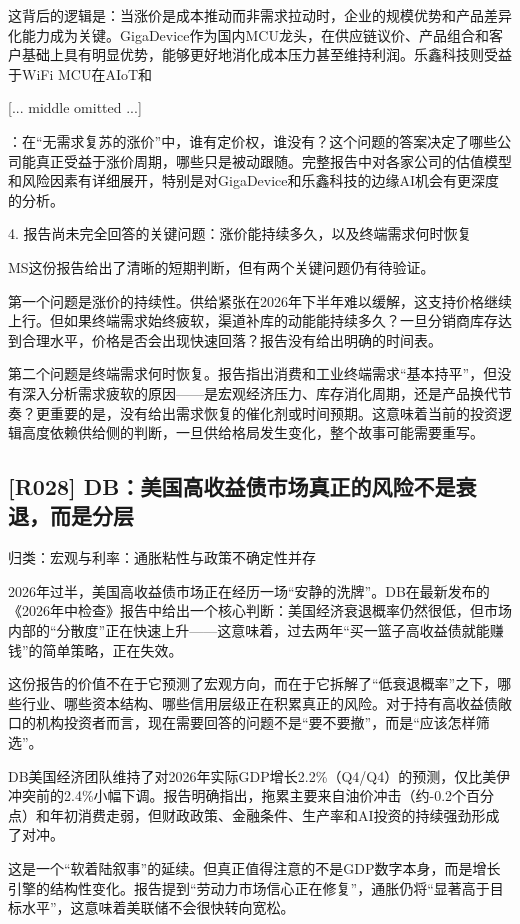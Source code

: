 \documentclass[11pt]{ctexart}
\begin{document}
这背后的逻辑是：当涨价是成本推动而非需求拉动时，企业的规模优势和产品差异化能力成为关键。GigaDevice作为国内MCU龙头，在供应链议价、产品组合和客户基础上具有明显优势，能够更好地消化成本压力甚至维持利润。乐鑫科技则受益于WiFi MCU在AIoT和

[... middle omitted ...]

：在“无需求复苏的涨价”中，谁有定价权，谁没有？这个问题的答案决定了哪些公司能真正受益于涨价周期，哪些只是被动跟随。完整报告中对各家公司的估值模型和风险因素有详细展开，特别是对GigaDevice和乐鑫科技的边缘AI机会有更深度的分析。

4. 报告尚未完全回答的关键问题：涨价能持续多久，以及终端需求何时恢复

MS这份报告给出了清晰的短期判断，但有两个关键问题仍有待验证。

第一个问题是涨价的持续性。供给紧张在2026年下半年难以缓解，这支持价格继续上行。但如果终端需求始终疲软，渠道补库的动能能持续多久？一旦分销商库存达到合理水平，价格是否会出现快速回落？报告没有给出明确的时间表。

第二个问题是终端需求何时恢复。报告指出消费和工业终端需求“基本持平”，但没有深入分析需求疲软的原因——是宏观经济压力、库存消化周期，还是产品换代节奏？更重要的是，没有给出需求恢复的催化剂或时间预期。这意味着当前的投资逻辑高度依赖供给侧的判断，一旦供给格局发生变化，整个故事可能需要重写。

\subsection{[R028] DB：美国高收益债市场真正的风险不是衰退，而是分层}
{\small\color{refgray}归类：宏观与利率：通胀粘性与政策不确定性并存}

2026年过半，美国高收益债市场正在经历一场“安静的洗牌”。DB在最新发布的《2026年中检查》报告中给出一个核心判断：美国经济衰退概率仍然很低，但市场内部的“分散度”正在快速上升——这意味着，过去两年“买一篮子高收益债就能赚钱”的简单策略，正在失效。

这份报告的价值不在于它预测了宏观方向，而在于它拆解了“低衰退概率”之下，哪些行业、哪些资本结构、哪些信用层级正在积累真正的风险。对于持有高收益债敞口的机构投资者而言，现在需要回答的问题不是“要不要撤”，而是“应该怎样筛选”。

DB美国经济团队维持了对2026年实际GDP增长2.2\%（Q4/Q4）的预测，仅比美伊冲突前的2.4\%小幅下调。报告明确指出，拖累主要来自油价冲击（约-0.2个百分点）和年初消费走弱，但财政政策、金融条件、生产率和AI投资的持续强劲形成了对冲。

这是一个“软着陆叙事”的延续。但真正值得注意的不是GDP数字本身，而是增长引擎的结构性变化。报告提到“劳动力市场信心正在修复”，通胀仍将“显著高于目标水平”，这意味着美联储不会很快转向宽松。
\end{document}
